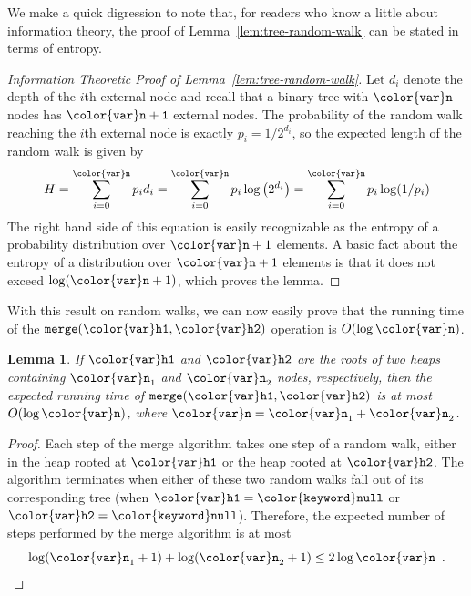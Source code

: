 \documentclass[10pt]{book}
\theoremstyle{plain}
\newtheorem{lem}{Lemma}[chapter]
\newcommand{\lemref}[1]{Lemma~\ref{lem:#1}}
\theoremstyle{definition}
\begin{document}
We make a quick digression to note that, for readers who know a little
about information theory, the proof of \lemref{tree-random-walk} can
be stated in terms of entropy.  
\begin{proof}[Information Theoretic Proof of \lemref{tree-random-walk}]
Let $d_i$ denote the depth of the $i$th external node and recall that a
binary tree with \ensuremath{\mathtt{{\color{var}n}}} nodes has \ensuremath{\mathtt{{\color{var}n}+1}} external nodes.  The probability
of the random walk reaching the $i$th external node is exactly
$p_i=1/2^{d_i}$, so the expected length of the random walk is given by
\[
   H=\sum_{i=0}^{\ensuremath{\mathtt{{\color{var}n}}}} p_id_i
    =\sum_{i=0}^{\ensuremath{\mathtt{{\color{var}n}}}} p_i\log\left(2^{d_i}\right)
    = \sum_{i=0}^{\ensuremath{\mathtt{{\color{var}n}}}}p_i\log({1/p_i})
\]
The right hand side of this equation is easily recognizable as the
entropy of a probability distribution over $\ensuremath{\mathtt{{\color{var}n}}}+1$ elements.  A basic
fact about the entropy of a distribution over $\ensuremath{\mathtt{{\color{var}n}}}+1$ elements is that
it does not exceed $\log(\ensuremath{\mathtt{{\color{var}n}}}+1)$, which proves the lemma.
\end{proof}

With this result on random walks, we can now easily prove that the
running time of the \ensuremath{\mathtt{merge({\color{var}h1},{\color{var}h2})}} operation is $O(\log \ensuremath{\mathtt{{\color{var}n}}})$.

\begin{lem}
  If \ensuremath{\mathtt{{\color{var}h1}}} and \ensuremath{\mathtt{{\color{var}h2}}} are the roots of two heaps containing $\ensuremath{\mathtt{{\color{var}n}}}_1$
  and $\ensuremath{\mathtt{{\color{var}n}}}_2$ nodes, respectively, then the expected running time of
  \ensuremath{\mathtt{merge({\color{var}h1},{\color{var}h2})}} is at most $O(\log \ensuremath{\mathtt{{\color{var}n}}})$, where $\ensuremath{\mathtt{{\color{var}n}}}=\ensuremath{\mathtt{{\color{var}n}}}_1+\ensuremath{\mathtt{{\color{var}n}}}_2$.
\end{lem}

\begin{proof}
  Each step of the merge algorithm takes one step of a random walk,
  either in the heap rooted at \ensuremath{\mathtt{{\color{var}h1}}} or the heap rooted at \ensuremath{\mathtt{{\color{var}h2}}}.
  The algorithm terminates when either of these two random walks fall
  out of its corresponding tree (when $\ensuremath{\mathtt{{\color{var}h1}}}=\ensuremath{\mathtt{{\color{keyword}null}}}$ or $\ensuremath{\mathtt{{\color{var}h2}}}=\ensuremath{\mathtt{{\color{keyword}null}}}$).
  Therefore, the expected number of steps performed by the merge algorithm
  is at most
  \[
     \log (\ensuremath{\mathtt{{\color{var}n}}}_1+1) + \log (\ensuremath{\mathtt{{\color{var}n}}}_2+1) \le 2\log \ensuremath{\mathtt{{\color{var}n}}} \enspace . \qedhere
  \]
\end{proof}
\end{document}
